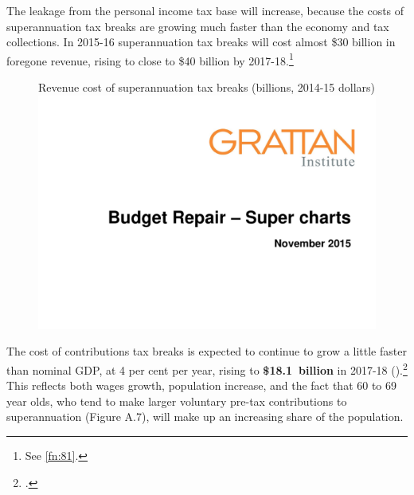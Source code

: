 \documentclass{grattanAlpha}
\begin{document}
The leakage from the personal income tax base will increase, because the costs of superannuation tax breaks are growing much faster than the economy and tax collections. 
In 2015-16 superannuation tax breaks will cost almost \$30 billion in foregone revenue, rising to close to \$40 billion by 2017-18.\footnote{See \cref{fn:81}.}

\begin{figure}
%
{Revenue cost of superannuation tax breaks (billions, 2014-15 dollars)}\label{fig:SUPER-2-5}
\includegraphics[width=\columnwidth,page=9]{super-atlas/PPTX.pdf}

\end{figure}

The cost of contributions tax breaks is expected to continue to grow a little faster than nominal GDP, at 4 per cent per year, rising to \textbf{\$18.1~billion} in 2017-18 ().\footcite[][4--14]{Treasury2015BudgetPapers201516}  
This reflects both wages growth, population increase, and the fact that 60 to 69 year olds, who tend to make larger voluntary pre-tax contributions to superannuation (Figure A.7), will make up an increasing share of the population. 
\end{document}
